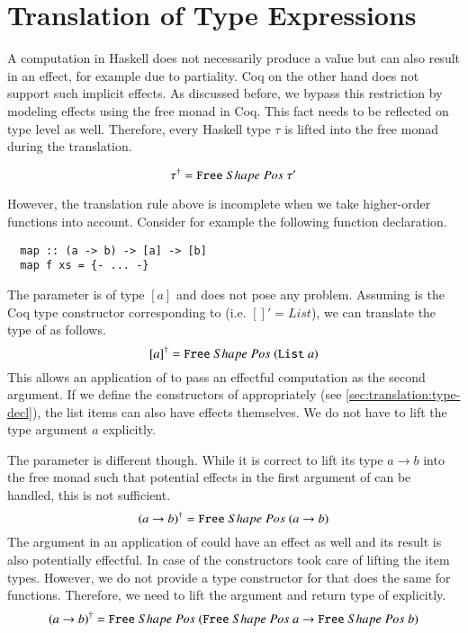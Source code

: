 \section{Translation of Type Expressions} \label{sec:translation:type}
A computation in Haskell does not necessarily produce a value but can also result in an effect, for example due to partiality.
Coq on the other hand does not support such implicit effects.
As discussed before, we bypass this restriction by modeling effects using the free monad in Coq.
This fact needs to be reflected on type level as well.
Therefore, every Haskell type $\tau$ is lifted into the free monad during the translation.

\[
  {\tau}^{\dagger} = {\texttt{Free}}\;Shape\;Pos\;{\tau'}
\]

However, the translation rule above is incomplete when we take higher-order functions into account.
Consider for example the following function declaration.
\begin{verbatim}
  map :: (a -> b) -> [a] -> [b]
  map f xs = {- ... -}
\end{verbatim}

The parameter  is of type $[a]$ and does not pose any problem.
Assuming  is the Coq type constructor corresponding to \haskell{[]} (i.e. $[]' = List$), we can translate the type of  as follows.
\[
  {[a]}^{\dagger} = {\texttt{Free}}\;Shape\;Pos\;{(\texttt{List}\;a)}
\]
This allows an application of  to pass an effectful computation as the second argument.
If we define the constructors of  appropriately (see \autoref{sec:translation:type-decl}), the list items can also have effects themselves.
We do not have to lift the type argument $a$ explicitly.

The parameter  is different though.
While it is correct to lift its type $a \rightarrow b$ into the free monad such that potential effects in the first argument of  can be handled, this is not sufficient.
\[
  {(a \rightarrow b)}^{\dagger} = {\texttt{Free}}\;Shape\;Pos\;{(a \rightarrow b)}
\]
The argument in an application of  could have an effect as well and its result is also potentially effectful.
In case of  the  constructors took care of lifting the item types.
However, we do not provide a type constructor for \coq{->} that does the same for functions.
Therefore, we need to lift the argument and return type of  explicitly.
\[
  {(a \rightarrow b)}^{\dagger} = {\texttt{Free}}\;Shape\;Pos\;{({\texttt{Free}}\;Shape\;Pos\;{a} \rightarrow {\texttt{Free}}\;Shape\;Pos\;{b})}
\]

